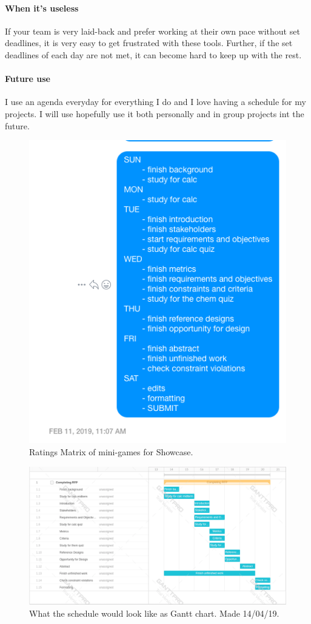 \documentclass[paper=a4, fontsize=11pt]{article} %
\begin{document}
            \paragraph{When it's useless}
            If your team is very laid-back and prefer working at their own pace without set deadlines, it is very easy to get frustrated with these tools. Further, if the set deadlines of each day are not met, it can become hard to keep up with the rest.
            \paragraph{Future use}
            I use an agenda everyday for everything I do and I love having a schedule for my projects. I will use hopefully use it both personally and in group projects int the future.
            \begin{figure}[H]
                \centering
	            \includegraphics[width=0.5\linewidth]{schedule.png}
	            \caption{Ratings Matrix of mini-games for Showcase.}
            \end{figure}
            \begin{figure}[H]
                \centering
	            \includegraphics[width=1\linewidth]{gantt.png}
	            \caption{What the schedule would look like as Gantt chart. Made 14/04/19.}
            \end{figure}
\end{document}
